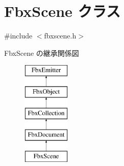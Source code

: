 \hypertarget{class_fbx_scene}{}\section{Fbx\+Scene クラス}
\label{class_fbx_scene}


{\ttfamily \#include $<$fbxscene.\+h$>$}

Fbx\+Scene の継承関係図\begin{figure}[H]
\begin{center}
\leavevmode
\includegraphics[height=5.000000cm]{class_fbx_scene}
\end{center}
\end{figure}
